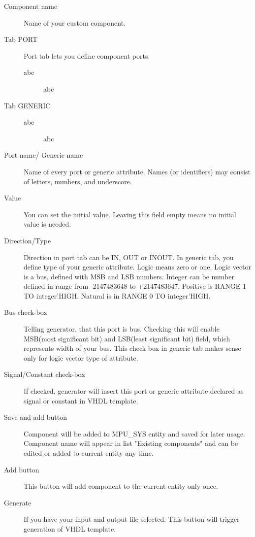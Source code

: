     \begin{description}
        \item [Component name]
            Name of your custom component.

        \item[Tab PORT]
            Port tab lets you define component ports.
            \begin{description}
                \item[abc] abc
            \end{description}

        \item[Tab GENERIC]
            \begin{description}
                \item[abc] abc
            \end{description}

        \item [Port name/ Generic name]
            Name of every port or generic attribute. Names (or identifiers) may consist of letters, numbers, and underscore.
        \item [Value]
            You can set the initial value. Leaving this field empty means no initial value is needed.
        \item [Direction/Type]
            Direction in port tab can be IN, OUT or INOUT. In generic tab, you define type of your generic attribute. Logic means zero or one. Logic vector is a bus, defined with MSB and LSB numbers.
            Integer can be number defined in range from -2147483648 to +2147483647. Positive is RANGE 1 TO integer’HIGH. Natural is in RANGE 0 TO integer’HIGH.
        \item [Bus check-box]
            Telling generator, that this port is bus. Checking this will enable MSB(most significant bit) and LSB(least significant bit) field, which represents width of your bus.
            This check box in generic tab makes sense only for logic vector type of attribute.
        \item [Signal/Constant check-box]
            If checked, generator will insert this port or generic attribute declared as signal or constant in VHDL template.
        \item [Save and add button]
            Component will be added to MPU\_SYS entity and saved for later usage. Component name will appear in list "Existing components" and can be edited or added to current entity any time.
        \item [Add button]
            This button will add component to the current entity only once.
        \item [Generate]
            If you have your input and output file selected. This button will trigger generation of VHDL template.\\
    \end{description}
